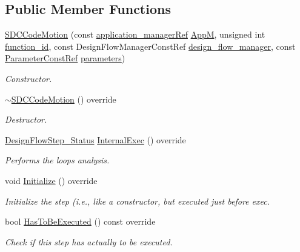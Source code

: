 \subsection*{Public Member Functions}
\begin{DoxyCompactItemize}
\item 
\hyperlink{classSDCCodeMotion_a7fa30bd2c85b0532071a1d813776cf53}{S\+D\+C\+Code\+Motion} (const \hyperlink{application__manager_8hpp_a04ccad4e5ee401e8934306672082c180}{application\+\_\+manager\+Ref} \hyperlink{classFrontendFlowStep_a0ac0d8db2a378416583f51c4faa59d15}{AppM}, unsigned int \hyperlink{classFunctionFrontendFlowStep_a58ef2383ad1a212a8d3f396625a4b616}{function\+\_\+id}, const Design\+Flow\+Manager\+Const\+Ref \hyperlink{classDesignFlowStep_ab770677ddf087613add30024e16a5554}{design\+\_\+flow\+\_\+manager}, const \hyperlink{Parameter_8hpp_a37841774a6fcb479b597fdf8955eb4ea}{Parameter\+Const\+Ref} \hyperlink{classDesignFlowStep_a802eaafe8013df706370679d1a436949}{parameters})
\begin{DoxyCompactList}\small\item\em Constructor. \end{DoxyCompactList}\item 
\hyperlink{classSDCCodeMotion_a2f00688119497ef05d3c48ce1f44e40a}{$\sim$\+S\+D\+C\+Code\+Motion} () override
\begin{DoxyCompactList}\small\item\em Destructor. \end{DoxyCompactList}\item 
\hyperlink{design__flow__step_8hpp_afb1f0d73069c26076b8d31dbc8ebecdf}{Design\+Flow\+Step\+\_\+\+Status} \hyperlink{classSDCCodeMotion_aa91dfc60f86626dbb167839a277a201e}{Internal\+Exec} () override
\begin{DoxyCompactList}\small\item\em Performs the loops analysis. \end{DoxyCompactList}\item 
void \hyperlink{classSDCCodeMotion_aa39c97469f1bafdb251a547487414aeb}{Initialize} () override
\begin{DoxyCompactList}\small\item\em Initialize the step (i.\+e., like a constructor, but executed just before exec. \end{DoxyCompactList}\item 
bool \hyperlink{classSDCCodeMotion_ae41623316514debbca9be2eed971fa09}{Has\+To\+Be\+Executed} () const override
\begin{DoxyCompactList}\small\item\em Check if this step has actually to be executed. \end{DoxyCompactList}\item 

\end{DoxyCompactItemize}
